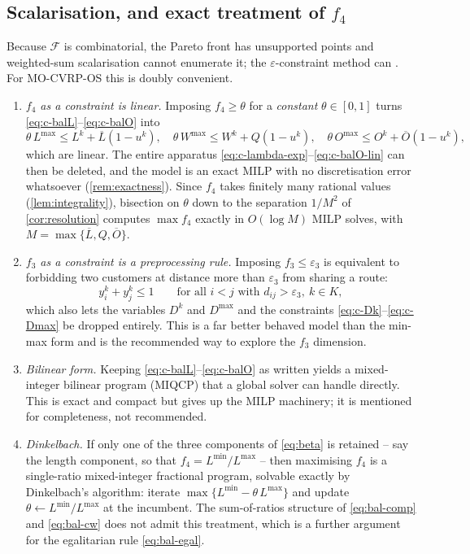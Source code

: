\documentclass[11pt,a4paper]{article}
\theoremstyle{definition}
\theoremstyle{plain}
\newcommand{\Feas}{\mathcal{F}}
\newcommand{\Veh}{K}
\newcommand{\Lmax}{L^{\max}}
\newcommand{\Wmax}{W^{\max}}
\newcommand{\Omax}{O^{\max}}
\newcommand{\Dmax}{D^{\max}}
\newcommand{\Lub}{\overline{L}}
\newcommand{\Oub}{\overline{O}}
\begin{document}
\subsection{Scalarisation, and exact treatment of \texorpdfstring{$f_4$}{f4}}
\label{sec:alt-eps}

Because $\Feas$ is combinatorial, the Pareto front has unsupported points and
weighted-sum scalarisation cannot enumerate it; the $\varepsilon$-constraint
method can \cite{Ehrgott2005}.  For \textup{\textsc{MO-CVRP-OS}} this is doubly
convenient.

\begin{enumerate}[label=(\alph*),leftmargin=*]
\item \emph{$f_4$ as a constraint is linear.}  Imposing $f_4 \ge \theta$ for a
  \emph{constant} $\theta \in [0,1]$ turns
  \eqref{eq:c-balL}--\eqref{eq:c-balO} into
  \[
    \theta\, \Lmax \le L^k + \Lub(1-u^k), \quad
    \theta\, \Wmax \le W^k + Q(1-u^k), \quad
    \theta\, \Omax \le O^k + \Oub(1-u^k),
  \]
  which are linear.  The entire apparatus
  \eqref{eq:c-lambda-exp}--\eqref{eq:c-balO-lin} can then be deleted, and the
  model is an exact MILP with no discretisation error whatsoever
  (\cref{rem:exactness}).  Since $f_4$ takes finitely many rational values
  (\cref{lem:integrality}), bisection on $\theta$ down to the separation
  $1/M^2$ of \cref{cor:resolution} computes $\max f_4$ exactly in
  $O(\log M)$ MILP solves, with $M = \max\{\Lub, Q, \Oub\}$.
\item \emph{$f_3$ as a constraint is a preprocessing rule.}  Imposing
  $f_3 \le \varepsilon_3$ is equivalent to forbidding two customers at distance
  more than $\varepsilon_3$ from sharing a route:
  \[
    y^k_i + y^k_j \le 1
    \qquad \text{for all } i<j \text{ with } d_{ij} > \varepsilon_3,\
    k \in \Veh,
  \]
  which also lets the variables $D^k$ and $\Dmax$ and the constraints
  \eqref{eq:c-Dk}--\eqref{eq:c-Dmax} be dropped entirely.  This is a far better
  behaved model than the min-max form and is the recommended way to explore the
  $f_3$ dimension.
\item \emph{Bilinear form.}  Keeping \eqref{eq:c-balL}--\eqref{eq:c-balO} as
  written yields a mixed-integer bilinear program (MIQCP) that a global solver
  can handle directly.  This is exact and compact but gives up the MILP
  machinery; it is mentioned for completeness, not recommended.
\item \emph{Dinkelbach.}  If only one of the three components of
  \eqref{eq:beta} is retained -- say the length component, so that
  $f_4 = L^{\min}/\Lmax$ -- then maximising $f_4$ is a single-ratio
  mixed-integer fractional program, solvable exactly by Dinkelbach's algorithm:
  iterate $\max\{L^{\min} - \theta\,\Lmax\}$ and update
  $\theta \leftarrow L^{\min}/\Lmax$ at the incumbent.  The sum-of-ratios
  structure of \eqref{eq:bal-comp} and \eqref{eq:bal-cw} does not admit this
  treatment, which is a further argument for the egalitarian rule
  \eqref{eq:bal-egal}.
\end{enumerate}
\end{document}
